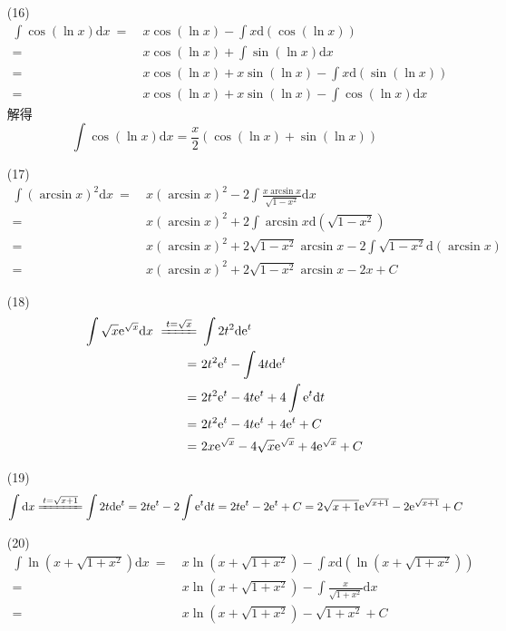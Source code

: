 \documentclass{article}
\newcommand{\dd}{\mathrm{d}}
\newcommand{\dx}{\dd x}
\newcommand{\ee}{\mathrm{e}}
\begin{document}
\begin{itemize}
    \item [(16)]
    \begin{align*}
        \int \cos\left(\ln x\right)\dx\ =\ & x \cos\left(\ln x\right) - \int x \dd\left(\cos\left(\ln x\right)\right) \\
        =\ & x \cos\left(\ln x\right) + \int \sin\left(\ln x\right)\dx \\
        =\ & x \cos\left(\ln x\right) + x \sin\left(\ln x\right) - \int x\dd\left(\sin\left(\ln x\right)\right) \\
        =\ & x \cos\left(\ln x\right) + x \sin\left(\ln x\right) - \int \cos\left(\ln x\right)\dx
    \end{align*}
    解得 $$\int \cos\left(\ln x\right)\dx = \frac{x}{2}\left(\cos\left(\ln x\right) + \sin \left(\ln x\right)\right)$$
    \item [(17)]
    \begin{align*}
        \int \left(\arcsin x\right)^2 \dx\ =\ & x \left(\arcsin x\right)^2 - 2\int \frac{x\arcsin x}{\sqrt{1 - x^2}}\dx \\
        =\ & x \left(\arcsin x\right)^2 + 2\int \arcsin x \dd \left(\sqrt{1 - x^2}\right) \\
        =\ & x \left(\arcsin x\right)^2 + 2 \sqrt{1 - x^2} \arcsin x - 2 \int \sqrt{1 - x^2}\dd\left(\arcsin x\right) \\
        =\ & x \left(\arcsin x\right)^2 + 2 \sqrt{1 - x^2} \arcsin x - 2x + C
    \end{align*}
    \item [(18)]
    \begin{align*}
        \int \sqrt{x}\ee^{\sqrt{x}} \dx\ \xlongequal[]{t = \sqrt{x}}\ & \int 2t^2 \dd \ee^t \\
        =\ & 2t^2 \ee^t - \int 4t \dd \ee^t \\
        =\ & 2t^2 \ee^t - 4t \ee^t + 4 \int \ee^t \dd t \\
        =\ & 2t^2 \ee^t - 4t \ee^t + 4\ee^t + C \\
        =\ & 2x\ee^{\sqrt{x}} - 4\sqrt{x}\ee^{\sqrt{x}} + 4\ee^{\sqrt{x}} + C
    \end{align*}
    \item [(19)]
    \begin{align*}
        \int \dx \xlongequal[]{t = \sqrt{x + 1}} \int 2t \dd \ee^t = 2t \ee^t - 2 \int \ee^t \dd t = 2t \ee^t - 2\ee^t + C = 2\sqrt{x + 1}\ee^{\sqrt{x + 1}} - 2\ee^{\sqrt{x + 1}} + C
    \end{align*}
    \item [(20)]
    \begin{align*}
        \int \ln \left(x + \sqrt{1 + x^2}\right) \dx\ =\ & x \ln \left(x + \sqrt{1 + x^2}\right) - \int x \dd \left(\ln \left(x + \sqrt{1 + x^2}\right)\right) \\
        =\ & x \ln \left(x + \sqrt{1 + x^2}\right) - \int \frac{x}{\sqrt{1 + x^2}}\dx \\
        =\ & x \ln \left(x + \sqrt{1 + x^2}\right) - \sqrt{1 + x^2} + C
    \end{align*}
\end{itemize}
\end{document}
